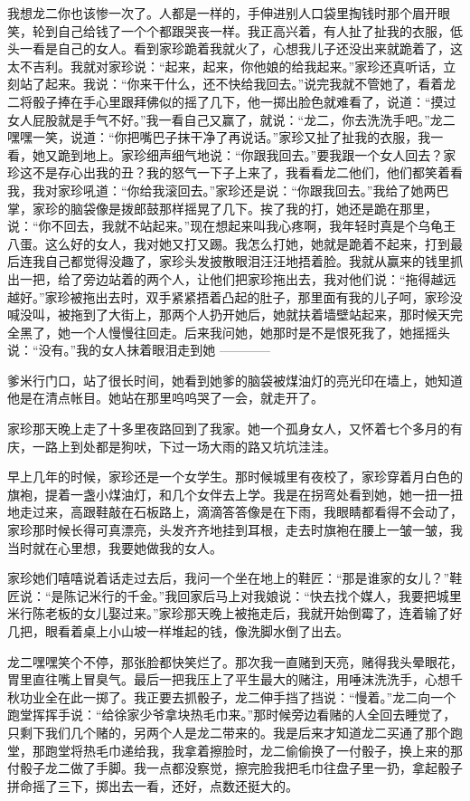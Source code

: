 \documentclass[12pt,UTF8]{ctexbook}
\begin{document}
我想龙二你也该惨一次了。人都是一样的，手伸进别人口袋里掏钱时那个眉开眼笑，轮到自己给钱了一个个都跟哭丧一样。我正高兴着，有人扯了扯我的衣服，低头一看是自己的女人。看到家珍跪着我就火了，心想我儿子还没出来就跪着了，这太不吉利。我就对家珍说：“起来，起来，你他娘的给我起来。”家珍还真听话，立刻站了起来。我说：“你来干什么，还不快给我回去。”说完我就不管她了，看着龙二将骰子捧在手心里跟拜佛似的摇了几下，他一掷出脸色就难看了，说道：“摸过女人屁股就是手气不好。”我一看自己又赢了，就说：“龙二，你去洗洗手吧。”龙二嘿嘿一笑，说道：“你把嘴巴子抹干净了再说话。”家珍又扯了扯我的衣服，我一看，她又跪到地上。家珍细声细气地说：“你跟我回去。”要我跟一个女人回去？家珍这不是存心出我的丑？我的怒气一下子上来了，我看看龙二他们，他们都笑着看我，我对家珍吼道：“你给我滚回去。”家珍还是说：“你跟我回去。”我给了她两巴掌，家珍的脑袋像是拨郎鼓那样摇晃了几下。挨了我的打，她还是跪在那里，说：“你不回去，我就不站起来。”现在想起来叫我心疼啊，我年轻时真是个乌龟王八蛋。这么好的女人，我对她又打又踢。我怎么打她，她就是跪着不起来，打到最后连我自己都觉得没趣了，家珍头发披散眼泪汪汪地捂着脸。我就从赢来的钱里抓出一把，给了旁边站着的两个人，让他们把家珍拖出去，我对他们说：“拖得越远越好。”家珍被拖出去时，双手紧紧捂着凸起的肚子，那里面有我的儿子呵，家珍没喊没叫，被拖到了大街上，那两个人扔开她后，她就扶着墙壁站起来，那时候天完全黑了，她一个人慢慢往回走。后来我问她，她那时是不是恨死我了，她摇摇头说：“没有。”我的女人抹着眼泪走到她
------------

爹米行门口，站了很长时间，她看到她爹的脑袋被煤油灯的亮光印在墙上，她知道他是在清点帐目。她站在那里呜呜哭了一会，就走开了。

家珍那天晚上走了十多里夜路回到了我家。她一个孤身女人，又怀着七个多月的有庆，一路上到处都是狗吠，下过一场大雨的路又坑坑洼洼。

早上几年的时候，家珍还是一个女学生。那时候城里有夜校了，家珍穿着月白色的旗袍，提着一盏小煤油灯，和几个女伴去上学。我是在拐弯处看到她，她一扭一扭地走过来，高跟鞋敲在石板路上，滴滴答答像是在下雨，我眼睛都看得不会动了，家珍那时候长得可真漂亮，头发齐齐地挂到耳根，走去时旗袍在腰上一皱一皱，我当时就在心里想，我要她做我的女人。

家珍她们嘻嘻说着话走过去后，我问一个坐在地上的鞋匠：“那是谁家的女儿？”鞋匠说：“是陈记米行的千金。”我回家后马上对我娘说：“快去找个媒人，我要把城里米行陈老板的女儿娶过来。”家珍那天晚上被拖走后，我就开始倒霉了，连着输了好几把，眼看着桌上小山坡一样堆起的钱，像洗脚水倒了出去。

龙二嘿嘿笑个不停，那张脸都快笑烂了。那次我一直赌到天亮，赌得我头晕眼花，胃里直往嘴上冒臭气。最后一把我压上了平生最大的赌注，用唾沫洗洗手，心想千秋功业全在此一掷了。我正要去抓骰子，龙二伸手挡了挡说：“慢着。”龙二向一个跑堂挥挥手说：“给徐家少爷拿块热毛巾来。”那时候旁边看赌的人全回去睡觉了，只剩下我们几个赌的，另两个人是龙二带来的。我是后来才知道龙二买通了那个跑堂，那跑堂将热毛巾递给我，我拿着擦脸时，龙二偷偷换了一付骰子，换上来的那付骰子龙二做了手脚。我一点都没察觉，擦完脸我把毛巾往盘子里一扔，拿起骰子拼命摇了三下，掷出去一看，还好，点数还挺大的。
\end{document}
